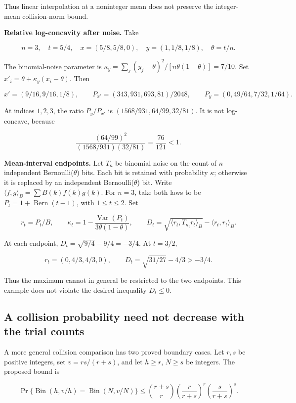 Thus linear interpolation at a noninteger mean does not preserve the integer-mean collision-norm bound.

\textbf{Relative log-concavity after noise.} Take

\[
n=3,\quad t=5/4,\quad
x=(5/8,5/8,0),\quad y=(1,1/8,1/8),\quad\theta=t/n.
\]

The binomial-noise parameter is \(\kappa_y=\sum_j(y_j-\theta)^2/[n\theta(1-\theta)]=7/10\). Set \(x'_i=\theta+\kappa_y(x_i-\theta)\). Then

\[
x'=(9/16,9/16,1/8),\qquad
P_{x'}=(343,931,693,81)/2048,\qquad
P_y=(0,49/64,7/32,1/64).
\]

At indices \(1,2,3\), the ratio \(P_y/P_{x'}\) is \((1568/931,64/99,32/81)\). It is not log-concave, because

\[
\frac{(64/99)^2}{(1568/931)(32/81)}=\frac{76}{121}<1.
\]

\textbf{Mean-interval endpoints.} Let \(T_\kappa\) be binomial noise on the count of \(n\) independent Bernoulli(\(\theta\)) bits. Each bit is retained with probability \(\kappa\); otherwise it is replaced by an independent Bernoulli(\(\theta\)) bit. Write \(\langle f,g\rangle_B=\sum B(k)f(k)g(k)\). For \(n=3\), take both laws to be \(P_t=1+\operatorname{Bern}(t-1)\), with \(1\le t\le2\). Set

\[
r_t=P_t/B,\qquad
\kappa_t=1-\frac{\operatorname{Var}(P_t)}{3\theta(1-\theta)},\qquad
D_t=\sqrt{\langle r_t,T_{\kappa_t}r_t\rangle_B}
-\langle r_t,r_t\rangle_B.
\]

At each endpoint, \(D_t=\sqrt{9/4}-9/4=-3/4\). At \(t=3/2\),

\[
r_t=(0,4/3,4/3,0),\qquad D_t=\sqrt{31/27}-4/3>-3/4.
\]

Thus the maximum cannot in general be restricted to the two endpoints. This example does not violate the desired inequality \(D_t\le0\).

\subsection{A collision probability need not decrease with the trial counts}\label{app:additional-17}

A more general collision comparison has two proved boundary cases. Let \(r,s\) be positive integers, set \(v=rs/(r+s)\), and let \(h\ge r\), \(N\ge s\) be integers. The proposed bound is

\begin{equation}
\Pr\{\operatorname{Bin}(h,v/h)=\operatorname{Bin}(N,v/N)\}
\le\binom{r+s}{r}\left(\frac r{r+s}\right)^r
\left(\frac s{r+s}\right)^s.
\label{eq:additional-6}
\end{equation}


